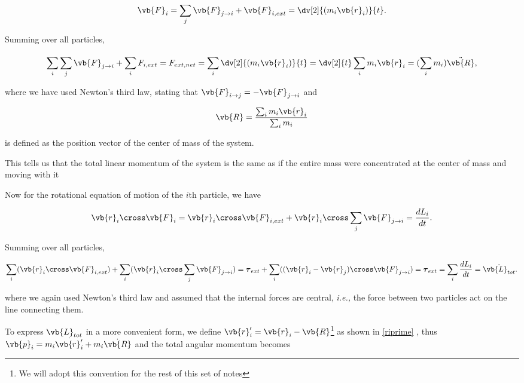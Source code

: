 \documentclass[a4paper,12pt]{report}
\begin{document}
\begin{equation}
	\vb{F} _{i} = \sum_{j}^{} \vb{F} _{j \rightarrow i} + \vb{F} _{i, ext} = \dv[2]{(m_{i} \vb{r} _{i} )}{t}     .
\end{equation}
 
Summing over all particles,

\begin{equation}
	\sum_{i}^{} \sum_{j}^{} \vb{F} _{j \rightarrow i} + \sum_{i}^{} F_{i,ext} = F_{ext, net } =  \sum_{i}^{} \dv[2]{(m_{i} \vb{r} _{i} )}{t} = \dv[2]{t} \sum_{i}^{} m_{i} \vb{r} _{i} =  (\sum_{i}^{} m_{i} ) \ddot{\vb{R} },
\end{equation}

where we have used Newton's third law, stating that \(\vb{F} _{i \rightarrow j} = -\vb{F} _{j \rightarrow i} \) and  

\begin{equation}
	\vb{R} = \frac{\sum_{i}^{} m_{i} \vb{r} _{i} }{\sum_{i}^{} m_{i}  } 
\end{equation}

is defined as the position vector of the center of mass of the system.

This tells us that the total linear momentum of the system is the same as if the entire mass were concentrated at the center of mass and moving with it

Now for the rotational equation of motion of the \(i \text{th} \) particle, we have

\begin{equation}
	 \vb{r }_{i}  \cross \vb{F} _{i} = \vb{r} _{i} \cross \vb{F} _{i, ext} + \vb{r} _{i} \cross \sum_{j}^{} \vb{F} _{j \rightarrow i} = \frac{dL_{i} }{dt}. 
\end{equation}

Summing over all particles, 

\begin{equation}
	\sum_{i}^{} (\vb{r} _{i} \cross \vb{F} _{i,ext}) + \sum_{i}^{} (\vb{r} _{i} \cross \sum_{j}^{} \vb{F} _{j \rightarrow i}) = \boldsymbol{\tau }_{ext}  + \sum_{i}^{} ((\vb{r} _{i} - \vb{r} _{j} ) \cross  \vb{F} _{j \rightarrow  i } ) = \boldsymbol{\tau } _{ext} = \sum_{i}^{} \frac{dL_{i} }{dt}  = \dot{\vb{L}_{tot}}. 
\end{equation}

where we again used Newton's third law and assumed that the internal forces are central, \textit{i.e.,} the force between two particles act on the line connecting them.

To express \(\vb{L} _{tot} \) in a more convenient form, we define \(\vb{r}'_{i} = \vb{r} _{i} - \vb{R}  \)\footnote{We will adopt this convention for the rest of this set of notes}  as shown in \cref{riprime}  , thus \(\vb{p} _{i} = m_{i}\dot{\vb{r} '_{i} }  + m_{i} \dot{\vb{R} }  \) and the total angular momentum becomes 
\end{document}
